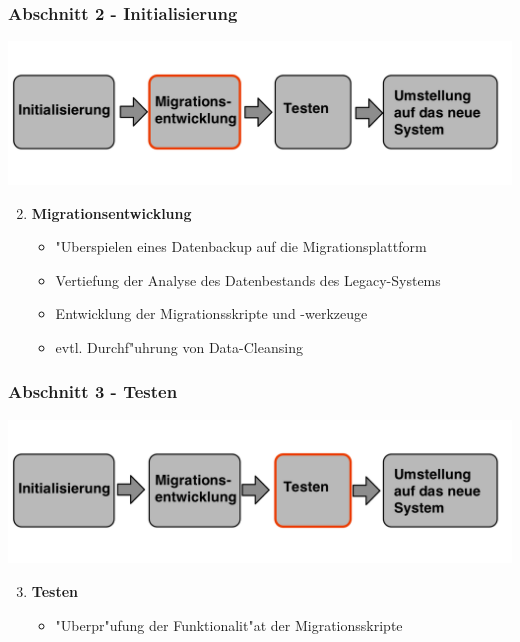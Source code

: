 \documentclass{beamer}
\begin{document}
	\begin{frame}
		\frametitle{Abschnitt 2 - Initialisierung}
		
		\centering
		\includegraphics[width=\textwidth]{../images/prozessmodell2t.png}\\
		
		\begin{enumerate}
			\setcounter{enumi}{1}
			
			\item \textbf{Migrationsentwicklung}
			\begin{itemize}
				\item "Uberspielen eines Datenbackup auf die Migrationsplattform
				\item Vertiefung der Analyse des Datenbestands des Legacy-Systems
				\item Entwicklung der Migrationsskripte und -werkzeuge
				\item evtl. Durchf"uhrung von Data-Cleansing
			\end{itemize}
			
		\end{enumerate}
	\end{frame}
	
	\begin{frame}
		\frametitle{Abschnitt 3 - Testen}
		
		\centering
		\includegraphics[width=\textwidth]{../images/prozessmodell3t.png}\\
		
		\begin{enumerate}
			\setcounter{enumi}{2}
			
			\item \textbf{Testen}
			\begin{itemize}
				\item "Uberpr"ufung der Funktionalit"at der Migrationsskripte
			\end{itemize}
			
		\end{enumerate}
	\end{frame}
	
\end{document}
